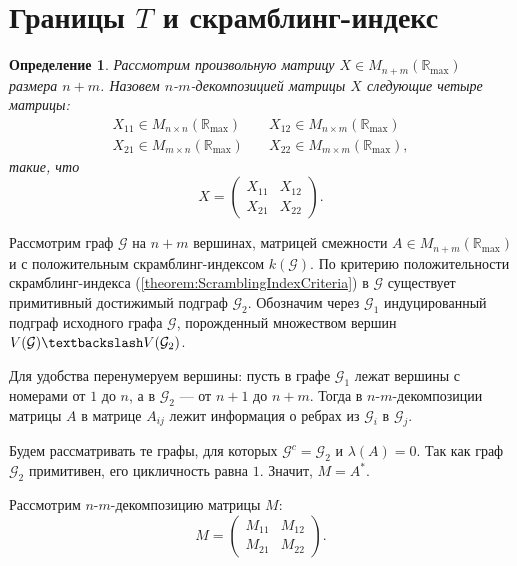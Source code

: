 \documentclass[12pt]{article}
\newtheorem{definition}[theorem]{Определение}
\begin{document}
\section{Границы $T$ и скрамблинг-индекс}
\begin{definition}
Рассмотрим произвольную матрицу $X \in M_{n+m}(\mathbb{R}_{\max})$ размера $n + m$. Назовем $n$-$m$-декомпозицией матрицы $X$ следующие четыре матрицы:\begin{align*}
X_{11} \in M_{n \times n}(\mathbb{R}_{\max}) & \quad X_{12} \in M_{n \times m}(\mathbb{R}_{\max}) \\
X_{21} \in M_{m \times n}(\mathbb{R}_{\max}) & \quad X_{22} \in M_{m \times m}(\mathbb{R}_{\max}),
\end{align*}
такие, что \begin{equation*}
X = \begin{pmatrix}
X_{11} & X_{12} \\
X_{21} & X_{22}
\end{pmatrix}.
\end{equation*}
\end{definition}

Рассмотрим граф $\mathcal{G}$ на $n + m$ вершинах, матрицей смежности $A \in M_{n+m}(\mathbb{R}_{\max})$ и с положительным скрамблинг-индексом $k(\mathcal{G})$. По критерию положительности скрамблинг-индекса (\ref{theorem:ScramblingIndexCriteria}) в $\mathcal{G}$ существует примитивный достижимый подграф $\mathcal{G}_2$.  Обозначим через $\mathcal{G}_1$ индуцированный подграф исходного графа $\mathcal{G}$, порожденный множеством вершин $V(\mathcal{G}) \textbackslash V(\mathcal{G}_2)$.

Для удобства перенумеруем вершины: пусть в графе $\mathcal{G}_1$ лежат вершины с номерами от $1$ до $n$, а в $\mathcal{G}_2$ --- от $n + 1$ до $n + m$. Тогда в $n$-$m$-декомпозиции матрицы $A$ в матрице $A_{ij}$ лежит информация о ребрах из $\mathcal{G}_i$ в $\mathcal{G}_j$.

Будем рассматривать те графы, для которых $\mathcal{G}^c = \mathcal{G}_2$ и $\lambda(A) = 0$. Так как граф $\mathcal{G}_2$ примитивен, его цикличность равна $1$. Значит, $M = A^*$.

Рассмотрим $n$-$m$-декомпозицию матрицы $M$:
\begin{equation*}
M = \begin{pmatrix}
M_{11} & M_{12}\\
M_{21} & M_{22}
\end{pmatrix}.
\end{equation*}
\end{document}
